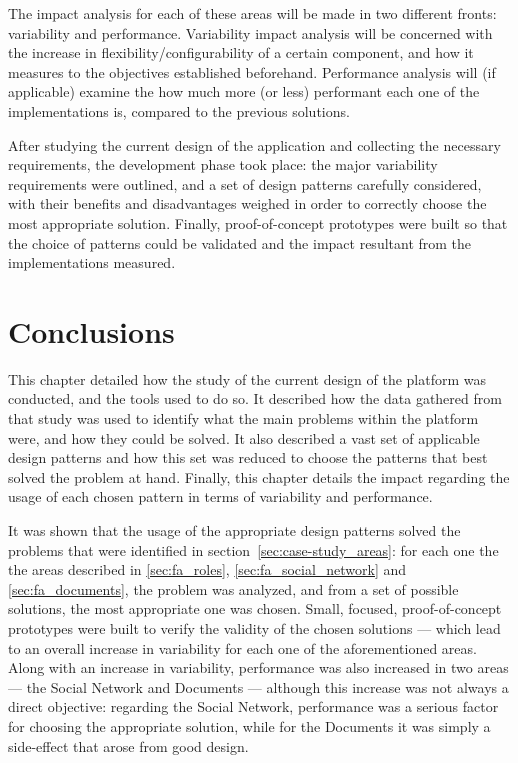 The impact analysis for each of these areas will be made in two different fronts: variability and performance. Variability impact analysis will be concerned with the increase in flexibility/configurability of a certain component, and how it measures to the objectives established beforehand. Performance analysis will (if applicable) examine the how much more (or less) performant each one of the implementations is, compared to the previous solutions.

After studying the current design of the application and collecting the necessary requirements, the development phase took place: the major variability requirements were outlined, and a set of design patterns carefully considered, with their benefits and disadvantages weighed in order to correctly choose the most appropriate solution. Finally, proof-of-concept prototypes were built so that the choice of patterns could be validated and the impact resultant from the implementations measured.





\clearpage

\section{Conclusions}\label{sec:approach_results_conclusions}

This chapter detailed how the study of the current design of the platform was conducted, and the tools used to do so. It described how the data gathered from that study was used to identify what the main problems within the platform were, and how they could be solved. It also described a vast set of applicable design patterns and how this set was reduced to choose the patterns that best solved the problem at hand. Finally, this chapter details the impact regarding the usage of each chosen pattern in terms of variability and performance.

It was shown that the usage of the appropriate design patterns solved the problems that were identified in section~\ref{sec:case-study_areas}: for each one the the areas described in \ref{sec:fa_roles}, \ref{sec:fa_social_network} and \ref{sec:fa_documents}, the problem was analyzed, and from a set of possible solutions, the most appropriate one was chosen. Small, focused, proof-of-concept prototypes were built to verify the validity of the chosen solutions --- which lead to an overall increase in variability for each one of the aforementioned areas. Along with an increase in variability, performance was also increased in two areas --- the Social Network and Documents --- although this increase was not always a direct objective: regarding the Social Network, performance was a serious factor for choosing the appropriate solution, while for the Documents it was simply a side-effect that arose from good design.

